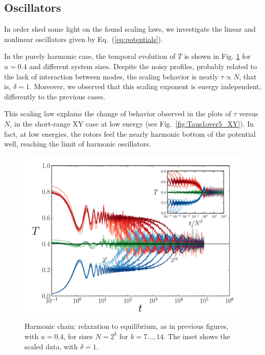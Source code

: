 \documentclass[aps,pre,showpacs,twocolumn,superscriptaddress,floatfix]{revtex4-1}
\begin{document}

\subsection{Oscillators}
\label{sec:other}

In order shed some light on the found scaling laws,  we investigate the linear 
and nonlinear oscillators given by Eq.~(\ref{eq:potentials}). 
 


In the purely harmonic case, the temporal evolution of $T$ is shown 
in Fig. \ref{fig:TempLogt_HC__U_0.4} 
for $u=0.4$ and different system sizes.   
%
Despite the noisy profiles, probably related to the lack of interaction between modes, 
the scaling behavior is neatly $\tau \propto N$, that is, $\delta=1$. 
%
Moreover, we observed that this scaling exponent  is energy independent, differently to the 
previous cases.
%

This scaling law explains the change of behavior observed in the plots of $\tau$ versus $N$, 
in the short-range XY case at low energy (see Fig.~\ref{fig:Taus1over5_XY}). 
In fact, at low energies, the rotors feel the nearly harmonic bottom
of the potential well, reaching the limit of harmonic oscillators.



\begin{figure}[h]
 \centering
 \includegraphics[width=1.0\linewidth]{TempLogt_HC__U_0.4__delta_1.0.pdf}
 \caption{Harmonic chain: relaxation to equilibrium, as in previous figures, 
 with $u=0.4$, for sizes $N=2^{k}$ for $k=7 \ldots, 14$. 
 The inset  shows the scaled data, with $\delta = 1$. 
}
 \label{fig:TempLogt_HC__U_0.4}
\end{figure}
\end{document}

